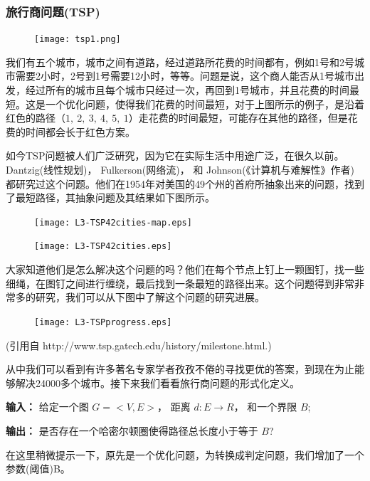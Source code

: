 \subsubsection{旅行商问题(TSP)}

\begin{figure}[H]
\centering
 \texttt{[image: tsp1.png]}
\end{figure}


我们有五个城市，城市之间有道路，经过道路所花费的时间都有，例如1号和2号城市需要2小时，2号到1号需要12小时，等等。问题是说，这个商人能否从1号城市出发，经过所有的城市且每个城市只经过一次，再回到1号城市，并且花费的时间最短。这是一个优化问题，使得我们花费的时间最短，对于上图所示的例子，是沿着红色的路径（$1, \ 2, \ 3, \ 4, \ 5, \ 1$）走花费的时间最短，可能存在其他的路径，但是花费的时间都会长于红色方案。

如今TSP问题被人们广泛研究，因为它在实际生活中用途广泛，在很久以前。Dantzig(线性规划)， Fulkerson(网络流)， 和 Johnson(《计算机与难解性》作者)都研究过这个问题。他们在1954年对美国的49个州的首府所抽象出来的问题，找到了最短路径，其抽象问题及其结果如下图所示。

\begin{figure}[H]
\centering
 \texttt{[image: L3-TSP42cities-map.eps]}
\end{figure}

\begin{figure}[H]
\centering
 \texttt{[image: L3-TSP42cities.eps]}
\end{figure}

大家知道他们是怎么解决这个问题的吗？他们在每个节点上钉上一颗图钉，找一些细绳，在图钉之间进行缠绕，最后找到一条最短的路径出来。这个问题得到非常非常多的研究，我们可以从下图中了解这个问题的研究进展。

\begin{figure}[H]
\centering
 \texttt{[image: L3-TSPprogress.eps]}
\end{figure}

(引用自 http://www.tsp.gatech.edu/history/milestone.html.)


从中我们可以看到有许多著名专家学者孜孜不倦的寻找更优的答案，到现在为止能够解决24000多个城市。接下来我们看看旅行商问题的形式化定义。

 {\bf 输入：} 给定一个图 $G=<V,E>$， 距离 $d: E \rightarrow R$， 和一个界限 $B$; 

 {\bf 输出：} 是否存在一个哈密尔顿圈使得路径总长度小于等于 $B$?

 在这里稍微提示一下，原先是一个优化问题，为转换成判定问题，我们增加了一个参数(阈值)B。

